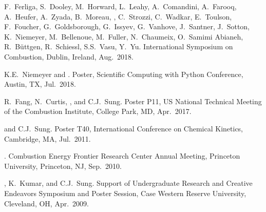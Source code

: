 \begin{bibmune}
    \item F.\ Ferliga, S.\ Dooley, M.\ Horward, L.\ Leahy, A.\ Comandini,
    A.\ Farooq, A.\ Heufer, A.\ Zyada, B.\ Moreau, ,
    C.\ Strozzi, C.\ Wadkar, E.\ Toulson, F.\ Foucher, G.\ Goldsborough,
    G.\ Issyev, G.\ Vanhove, J.\ Santner, J.\ Sotton, K.\ Niemeyer, M.\ Bellenoue,
    M.\ Fuller, N.\ Chaumeix, O.\ Samimi Abianeh, R.\ Büttgen, R.\ Schiessl,
    S.S.\ Vasu, Y.\ Yu. 
     International Symposium on Combustion, Dublin, Ireland, Aug.\ 2018.

    \item K.E.\ Niemeyer and .
     Poster, 
    Scientific Computing with Python Conference, Austin, TX, Jul.\ 2018.\\

    \item R.\ Fang, N.\ Curtis, , and C.J.\ Sung.
     Poster
    P11,  US National Technical Meeting of the Combustion
    Institute, College Park, MD, Apr.\ 2017.

    \item {} and C.J.\ Sung.  Poster T40,  International
    Conference on Chemical Kinetics, Cambridge, MA, Jul.\ 2011.\\

    \item {}. 
     Combustion Energy Frontier Research Center
    Annual Meeting, Princeton University, Princeton, NJ,
    Sep.\ 2010.\\

    \item {}, K.\ Kumar, and C.J.\ Sung.  Support of Undergraduate
    Research and Creative Endeavors Symposium and Poster Session,
    Case Western Reserve University, Cleveland, OH, Apr.\ 2009.\\
\end{bibmune}

